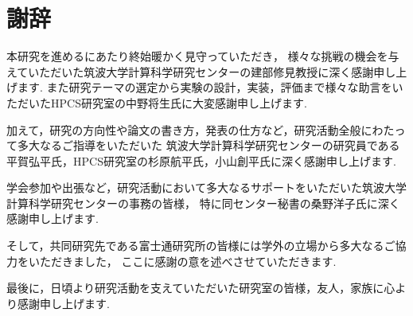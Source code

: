 \documentclass[a4paper,11pt]{jreport}
\begin{document}
\chapter*{謝辞}
本研究を進めるにあたり終始暖かく見守っていただき，
様々な挑戦の機会を与えていただいた筑波大学計算科学研究センターの建部修見教授に深く感謝申し上げます.
また研究テーマの選定から実験の設計，実装，評価まで様々な助言をいただいたHPCS研究室の中野将生氏に大変感謝申し上げます.

加えて，研究の方向性や論文の書き方，発表の仕方など，研究活動全般にわたって多大なるご指導をいただいた
筑波大学計算科学研究センターの研究員である平賀弘平氏，HPCS研究室の杉原航平氏，小山創平氏に深く感謝申し上げます.

学会参加や出張など，研究活動において多大なるサポートをいただいた筑波大学計算科学研究センターの事務の皆様，
特に同センター秘書の桑野洋子氏に深く感謝申し上げます.

そして，共同研究先である富士通研究所の皆様には学外の立場から多大なるご協力をいただきました，
ここに感謝の意を述べさせていただきます.

最後に，日頃より研究活動を支えていただいた研究室の皆様，友人，家族に心より感謝申し上げます.


\newpage

\renewcommand{\bibname}{参考文献}

%
%





\nocite{*}


\end{document}
